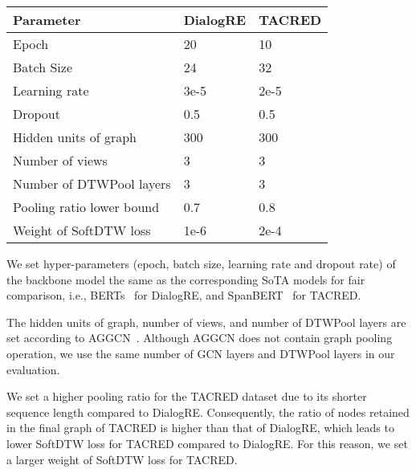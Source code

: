 \documentclass[letterpaper]{article} \usepackage{aaai21}  \usepackage{times}  \usepackage{helvet} \usepackage{courier}  \usepackage[hyphens]{url}  \usepackage{graphicx} \urlstyle{rm} \def\UrlFont{\rm}  \usepackage{graphicx}  \usepackage{natbib}  \usepackage{caption}
\begin{document}
\begin{center}
\begin{tabular}{l|l l}
\toprule
Parameter                  & DialogRE & TACRED   \\ \midrule
Epoch                     & 20       & 10       \\
Batch Size                 & 24       & 32       \\
Learning rate             & 3e-5     & 2e-5 \\
Dropout                   & 0.5      & 0.5      \\
Hidden units of graph     & 300      & 300      \\
Number of views           & 3        & 3        \\
Number of DTWPool layers  & 3        & 3        \\
Pooling ratio lower bound & 0.7      & 0.8      \\
Weight of SoftDTW loss    & 1e-6     & 2e-4    \\
\bottomrule
\end{tabular}
\end{center}

We set hyper-parameters (epoch, batch size, learning rate and dropout rate) of the backbone model the same as the corresponding SoTA models for fair comparison, i.e., BERTs~\cite{yu-etal-2020-dialogue} for DialogRE, and SpanBERT~\cite{joshi2020spanbert} for TACRED. 

The hidden units of graph, number of views, and number of DTWPool layers are set  according to AGGCN~\cite{guo-etal-2019-attention}. Although AGGCN does not contain graph pooling operation, we use the same number of GCN layers and DTWPool layers in our evaluation. 

We set a higher pooling ratio for the TACRED dataset due to its shorter sequence length compared to DialogRE. Consequently, the ratio of nodes retained in the final graph of TACRED is higher than that of DialogRE, which leads to lower SoftDTW loss for TACRED compared to DialogRE. For this reason, we set a larger weight of SoftDTW loss for TACRED.


\end{document}
